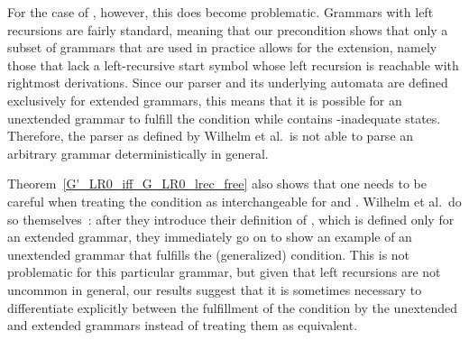 \begin{isabellebody}
\begin{isamarkuptext}
For the case of , however, this does become problematic. Grammars with left recursions
are fairly standard, meaning that our precondition shows that only a subset of  grammars that
are used in practice allows for the extension, namely those that lack a left-recursive start symbol
whose left recursion is reachable with rightmost derivations. Since our parser and its underlying
automata are defined exclusively for extended grammars, this means that it is possible for an
unextended grammar  to fulfill the  condition while  contains -inadequate
states. Therefore, the  parser as defined by Wilhelm et al.\ is not able to parse
an arbitrary  grammar deterministically in general.

Theorem~\ref{G'_LR0_iff_G_LR0_lrec_free} also shows that one needs to be careful when treating the
 condition as interchangeable for  and . Wilhelm et al.\ do so 
themselves~\cite[p. 113]{Wilhelm}: after they introduce their definition of , which is
defined only for an extended grammar, they immediately go on to show an example of an unextended
grammar that fulfills the (generalized)  condition. This is not problematic for this
particular grammar, but given that left recursions are not uncommon in general, our results suggest
that it is sometimes necessary to differentiate explicitly between the fulfillment of the condition
by the unextended and extended grammars instead of treating them as equivalent.
 

\end{isamarkuptext}
\end{isabellebody}
